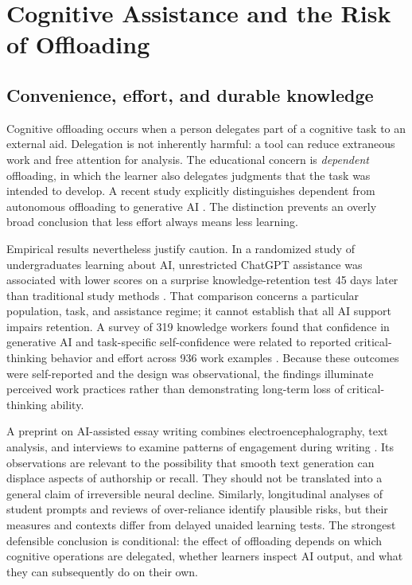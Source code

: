 \documentclass[11pt,a4paper]{article}
\begin{document}
\section{Cognitive Assistance and the Risk of Offloading}
\subsection{Convenience, effort, and durable knowledge}
Cognitive offloading occurs when a person delegates part of a cognitive task to an external aid. Delegation is not inherently harmful: a tool can reduce extraneous work and free attention for analysis. The educational concern is \emph{dependent} offloading, in which the learner also delegates judgments that the task was intended to develop. A recent study explicitly distinguishes dependent from autonomous offloading to generative AI \cite{P38}. The distinction prevents an overly broad conclusion that less effort always means less learning.

Empirical results nevertheless justify caution. In a randomized study of undergraduates learning about AI, unrestricted ChatGPT assistance was associated with lower scores on a surprise knowledge-retention test 45 days later than traditional study methods \cite{P12}. That comparison concerns a particular population, task, and assistance regime; it cannot establish that all AI support impairs retention. A survey of 319 knowledge workers found that confidence in generative AI and task-specific self-confidence were related to reported critical-thinking behavior and effort across 936 work examples \cite{P43}. Because these outcomes were self-reported and the design was observational, the findings illuminate perceived work practices rather than demonstrating long-term loss of critical-thinking ability.

A preprint on AI-assisted essay writing combines electroencephalography, text analysis, and interviews to examine patterns of engagement during writing \cite{P53}. Its observations are relevant to the possibility that smooth text generation can displace aspects of authorship or recall. They should not be translated into a general claim of irreversible neural decline. Similarly, longitudinal analyses of student prompts \cite{P15} and reviews of over-reliance \cite{P45} identify plausible risks, but their measures and contexts differ from delayed unaided learning tests. The strongest defensible conclusion is conditional: the effect of offloading depends on which cognitive operations are delegated, whether learners inspect AI output, and what they can subsequently do on their own.
\end{document}
